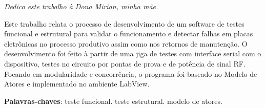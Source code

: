\begin{dedicatoria}
   \vspace*{\fill}
   \centering
   \noindent
    \textit{ Dedico este trabalho à Dona Mirian, minha mãe.} \vspace*{\fill}
\end{dedicatoria}

\begin{agradecimentos}
\begin{comment}

Agradeço a Heloisa, sua ajuda e motivação fez com que esse trabalho acontecece.

Aos meus amigos, Lucas Stéfano, João Gabriel Reis, Petrus, pelo apoio e ajuda com revisões.

Depois de quase nove anos de curso, agradeço especialmente à paciência da minha família, e em especial da minha mãe. 

Ao povo brasileiro que pagam pela universidade pública. Espero que meu trabalho e carreira possam refletir numa nação melhor para seu povo.

E a todas as outras pessoas, que não
\end{comment}
\end{agradecimentos}

\begin{epigrafe}
    \vspace*{\fill}
	\begin{flushright}
	\end{flushright}
\end{epigrafe}


\setlength{\absparsep}{18pt} %
\begin{resumo}
    Este trabalho relata o processo de desenvolvimento de um software de testes funcional e estrutural para validar o funcionamento e detectar falhas em placas eletrônicas no processo produtivo assim como nos retornos de manutenção. O desenvolvimento foi feito à partir de uma jiga de testes com interface serial com o dispositivo, testes no circuito por pontas de prova e de potência de sinal RF. Focando em modularidade e concorrência, o programa foi baseado no Modelo de Atores e implementado no ambiente LabView. %

 \textbf{Palavras-chaves}: teste funcional. teste estrutural. modelo de atores.
\end{resumo}

